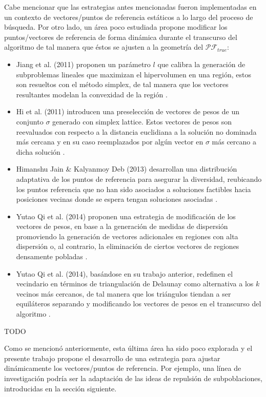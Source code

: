 Cabe mencionar que las estrategias antes mencionadas fueron implementadas en un contexto de vectores/puntos de referencia estáticos a lo largo del proceso de búsqueda. Por otro lado, un área poco estudiada propone modificar los puntos/vectores de referencia de forma dinámica durante el transcurso del algoritmo de tal manera que éstos se ajusten a la geometría del $\mathcal{PF}_{true}$:
\begin{itemize}
  \item Jiang et al. (2011) proponen un parámetro $l$ que calibra la generación de subproblemas lineales que maximizan el hipervolumen en una región, estos son resueltos con el método simplex, de tal manera que los vectores resultantes modelan la convexidad de la región \cite{jiang2011multiobjective}.
  \item Hi et al. (2011) introducen una preselección de vectores de pesos de un conjunto $\sigma$  generado con simplex lattice. Estos vectores de pesos son reevaluados con respecto  a la distancia euclidiana  a la solución no dominada más cercana y en su caso reemplazados por algún vector en $\sigma$ más cercano a dicha solución \cite{li2011adaptive}.
  \item Himanshu Jain \& Kalyanmoy Deb (2013) desarrollan una distribución adaptativa de los puntos de referencia para asegurar la diversidad, reubicando los puntos referencia que no han sido asociados a soluciones factibles hacia posiciones vecinas donde se espera tengan soluciones asociadas \cite{jain2013improved}.
  \item Yutao Qi et al. (2014) proponen una estrategia de modificación de los vectores de pesos, en base a la generación de medidas de dispersión promoviendo la generación de vectores adicionales en regiones con alta dispersión o, al contrario, la eliminación de ciertos vectores de regiones densamente pobladas \cite{doi:10.1162/EVCOa00109}.
  \item Yutao Qi et al. (2014), basándose en su trabajo anterior, redefinen el vecindario en términos de triangulación de Delaunay como alternativa a los $k$ vecinos más cercanos, de tal manera que los triángulos tiendan a ser equiláteros separando y modificando los vectores de pesos en el transcurso del algoritmo \cite{qi2014moea}.
\end{itemize}

{\huge TODO}

Como se mencionó anteriormente, esta última área ha sido poco explorada y el presente trabajo propone el desarrollo de una estrategia para ajustar dinámicamente los vectores/puntos de referencia. Por ejemplo, una línea de investigación podría ser la adaptación de las ideas de repulsión de subpoblaciones, introducidas en la sección siguiente.

